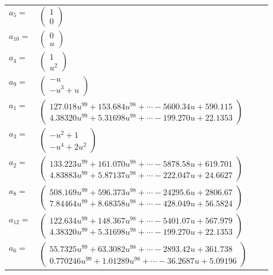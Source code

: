 \documentclass[1p]{elsarticle_modified}
\theoremstyle{definition}
\begin{document}
\begin{tabular}{m{7pt} m{180pt} m{7pt} m{180pt} }
\flushright $a_{5}=$&$\begin{pmatrix}1\\0\end{pmatrix}$ \\
\flushright $a_{10}=$&$\begin{pmatrix}0\\u\end{pmatrix}$ \\
\flushright $a_{4}=$&$\begin{pmatrix}1\\u^2\end{pmatrix}$ \\
\flushright $a_{9}=$&$\begin{pmatrix}- u\\- u^3+u\end{pmatrix}$ \\
\flushright $a_{1}=$&$\begin{pmatrix}127.018 u^{99}+153.684 u^{98}+\cdots-5600.34 u+590.115\\4.38320 u^{99}+5.31698 u^{98}+\cdots-199.270 u+22.1353\end{pmatrix}$ \\
\flushright $a_{3}=$&$\begin{pmatrix}- u^2+1\\- u^4+2 u^2\end{pmatrix}$ \\
\flushright $a_{2}=$&$\begin{pmatrix}133.223 u^{99}+161.070 u^{98}+\cdots-5878.58 u+619.701\\4.83883 u^{99}+5.87137 u^{98}+\cdots-222.047 u+24.6627\end{pmatrix}$ \\
\flushright $a_{8}=$&$\begin{pmatrix}508.169 u^{99}+596.373 u^{98}+\cdots-24295.6 u+2806.67\\7.84464 u^{99}+8.68358 u^{98}+\cdots-428.049 u+56.5824\end{pmatrix}$ \\
\flushright $a_{12}=$&$\begin{pmatrix}122.634 u^{99}+148.367 u^{98}+\cdots-5401.07 u+567.979\\4.38320 u^{99}+5.31698 u^{98}+\cdots-199.270 u+22.1353\end{pmatrix}$ \\
\flushright $a_{6}=$&$\begin{pmatrix}55.7325 u^{99}+63.3082 u^{98}+\cdots-2893.42 u+361.738\\0.770246 u^{99}+1.01289 u^{98}+\cdots-36.2687 u+5.09196\end{pmatrix}$ \\

\end{tabular}
\end{document}

